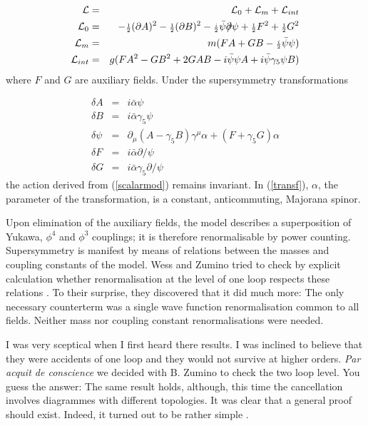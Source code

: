 \documentclass[a4paper,11pt]{article}
\begin{document}
\begin{eqnarray}
\label{scalarmod}
{\cal{L}} & = & {\cal{L}}_0 + {\cal{L}}_m + {\cal{L}}_{int} \nonumber  \\
{\cal{L}}_0  &=  &-  {\scriptstyle {\frac{1}{2}}}(\partial A)^2 - 
{\scriptstyle {\frac{1}{2}}}(\partial B)^2 - {\scriptstyle {\frac{i}{2}}} 
\bar{\psi}\partial \!\!\!/ \psi + {\scriptstyle {\frac{1}{2}}} F^2 + 
{\scriptstyle {\frac{1}{2}}} G^2 \nonumber  \\
{\cal{L}}_m & = &  m(FA + GB - {\scriptstyle {\frac{i}{2}}}  \bar{\psi} \psi )  
\nonumber \\
{\cal{L}}_{int} & = & g(FA^2 - GB^2 + 2GAB - i \bar{\psi} \psi A + i \bar{\psi} 
\gamma_5 \psi B)
\end{eqnarray}
where $F$ and $G$ are auxiliary fields. Under the supersymmetry
transformations

\begin{eqnarray}
\label{transf}
\delta A & = & i \bar{\alpha} \psi \nonumber \\
\delta B & = & i \bar{\alpha} \gamma_5 \psi \nonumber \\
\delta \psi & = & \partial_{\mu} (A - \gamma_{5} B)  \gamma^{\mu}\alpha  + 
(F + \gamma_{5}G)\alpha    \\
\delta F & = & i \bar{\alpha} \partial \!\!\!/ \psi  \nonumber \\
\delta G & = & i \bar{\alpha} \gamma_{5} \partial \!\!\!/ \psi  \nonumber
\end{eqnarray}
\noindent
the action derived from (\ref{scalarmod}) remains invariant. In (\ref{transf}),  
$\alpha$, the parameter of the transformation, is a constant, anticommuting, Majorana 
spinor.

Upon elimination of the auxiliary fields, the model describes a
superposition of Yukawa, $\phi^{4}$ and $\phi^{3}$ couplings; it is
therefore renormalisable by power counting. Supersymmetry is manifest
by means of relations between the masses and coupling constants of
the model. Wess and Zumino tried to check by explicit calculation
whether renormalisation at the level of one loop respects these
relations \cite{WZII}. To their surprise, they discovered that it did much more:
The only necessary counterterm was a single wave function
renormalisation common to all fields. Neither mass nor coupling
constant renormalisations were needed.

I was very sceptical when I first heard there results. I was inclined
to believe that they were accidents of one loop and they would not
survive at higher orders. {\it Par acquit de conscience} we decided
with B. Zumino to check the two loop level. You guess the answer:
The same result holds, although, this time the cancellation involves
diagrammes with different topologies. It was clear that a general proof should exist.
Indeed, it turned out to be rather simple \cite {IZ}.
\end{document}

